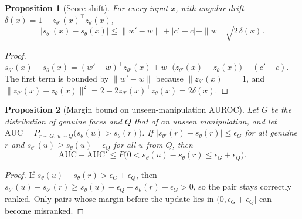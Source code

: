 \documentclass[journal]{IEEEtran}
\newtheorem{proposition}{Proposition}
\begin{document}
\begin{proposition}[Score shift]
\label{prop:shift}
For every input $x$, with angular drift $\delta(x)=1-z_{\theta'}(x)^{\top}z_\theta(x)$,
\begin{equation}
|s_{\theta'}(x)-s_\theta(x)|\le\|w'-w\|+|c'-c|+\|w\|\sqrt{2\,\delta(x)} .
\label{eq:shift}
\end{equation}
\end{proposition}
\begin{proof}
$s_{\theta'}(x)-s_\theta(x)=(w'-w)^{\top}z_{\theta'}(x)+w^{\top}\big(z_{\theta'}(x)-z_\theta(x)\big)+(c'-c)$. The first term is bounded by $\|w'-w\|$ because $\|z_{\theta'}(x)\|=1$, and $\|z_{\theta'}(x)-z_\theta(x)\|^2=2-2z_{\theta'}(x)^{\top}z_\theta(x)=2\delta(x)$.
\end{proof}

\begin{proposition}[Margin bound on unseen-manipulation AUROC]
\label{prop:auc}
Let $G$ be the distribution of genuine faces and $Q$ that of an unseen manipulation, and let $\mathrm{AUC}=P_{r\sim G,\,u\sim Q}\big(s_\theta(u)>s_\theta(r)\big)$. If $|s_{\theta'}(r)-s_\theta(r)|\le\epsilon_G$ for all genuine $r$ and $s_{\theta'}(u)\ge s_\theta(u)-\epsilon_Q$ for all $u$ from $Q$, then
\begin{equation}
\mathrm{AUC}-\mathrm{AUC}'\le P\big(0<s_\theta(u)-s_\theta(r)\le\epsilon_G+\epsilon_Q\big).
\label{eq:auc}
\end{equation}
\end{proposition}
\begin{proof}
If $s_\theta(u)-s_\theta(r)>\epsilon_G+\epsilon_Q$, then $s_{\theta'}(u)-s_{\theta'}(r)\ge s_\theta(u)-\epsilon_Q-s_\theta(r)-\epsilon_G>0$, so the pair stays correctly ranked. Only pairs whose margin before the update lies in $(0,\epsilon_G+\epsilon_Q]$ can become misranked.
\end{proof}
\end{document}
